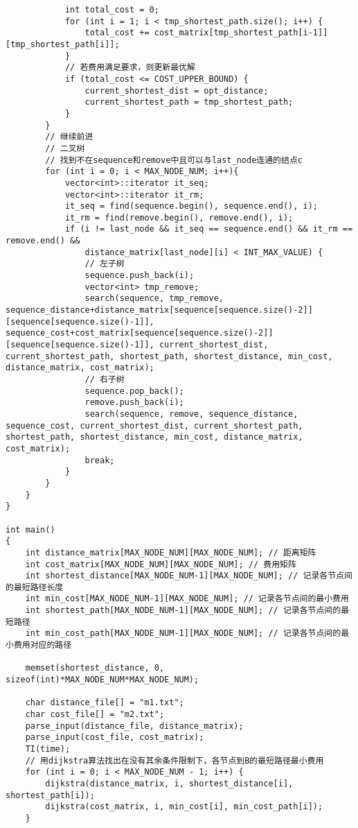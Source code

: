 \documentclass{article}
\begin{document}
\begin{lstlisting}
            int total_cost = 0;
            for (int i = 1; i < tmp_shortest_path.size(); i++) {
                total_cost += cost_matrix[tmp_shortest_path[i-1]][tmp_shortest_path[i]];
            }
            // 若费用满足要求，则更新最优解
            if (total_cost <= COST_UPPER_BOUND) {
                current_shortest_dist = opt_distance;
                current_shortest_path = tmp_shortest_path;
            }
        }
        // 继续前进
        // 二叉树
        // 找到不在sequence和remove中且可以与last_node连通的结点c
        for (int i = 0; i < MAX_NODE_NUM; i++){
            vector<int>::iterator it_seq;
            vector<int>::iterator it_rm;
            it_seq = find(sequence.begin(), sequence.end(), i);
            it_rm = find(remove.begin(), remove.end(), i);
            if (i != last_node && it_seq == sequence.end() && it_rm == remove.end() &&
                distance_matrix[last_node][i] < INT_MAX_VALUE) {
                // 左子树
                sequence.push_back(i);
                vector<int> tmp_remove;
                search(sequence, tmp_remove, sequence_distance+distance_matrix[sequence[sequence.size()-2]][sequence[sequence.size()-1]], sequence_cost+cost_matrix[sequence[sequence.size()-2]][sequence[sequence.size()-1]], current_shortest_dist, current_shortest_path, shortest_path, shortest_distance, min_cost, distance_matrix, cost_matrix);
                // 右子树
                sequence.pop_back();
                remove.push_back(i);
                search(sequence, remove, sequence_distance, sequence_cost, current_shortest_dist, current_shortest_path, shortest_path, shortest_distance, min_cost, distance_matrix, cost_matrix);
                break;
            }
        }
    }
}

int main()
{
    int distance_matrix[MAX_NODE_NUM][MAX_NODE_NUM]; // 距离矩阵
    int cost_matrix[MAX_NODE_NUM][MAX_NODE_NUM]; // 费用矩阵
    int shortest_distance[MAX_NODE_NUM-1][MAX_NODE_NUM]; // 记录各节点间的最短路径长度
    int min_cost[MAX_NODE_NUM-1][MAX_NODE_NUM]; // 记录各节点间的最小费用
    int shortest_path[MAX_NODE_NUM-1][MAX_NODE_NUM]; // 记录各节点间的最短路径
    int min_cost_path[MAX_NODE_NUM-1][MAX_NODE_NUM]; // 记录各节点间的最小费用对应的路径

    memset(shortest_distance, 0, sizeof(int)*MAX_NODE_NUM*MAX_NODE_NUM);

    char distance_file[] = "m1.txt";
    char cost_file[] = "m2.txt";
    parse_input(distance_file, distance_matrix);
    parse_input(cost_file, cost_matrix);
    TI(time);
    // 用dijkstra算法找出在没有其余条件限制下，各节点到B的最短路径最小费用
    for (int i = 0; i < MAX_NODE_NUM - 1; i++) {
        dijkstra(distance_matrix, i, shortest_distance[i], shortest_path[i]);
        dijkstra(cost_matrix, i, min_cost[i], min_cost_path[i]);
    }


\end{lstlisting}
\end{document}
